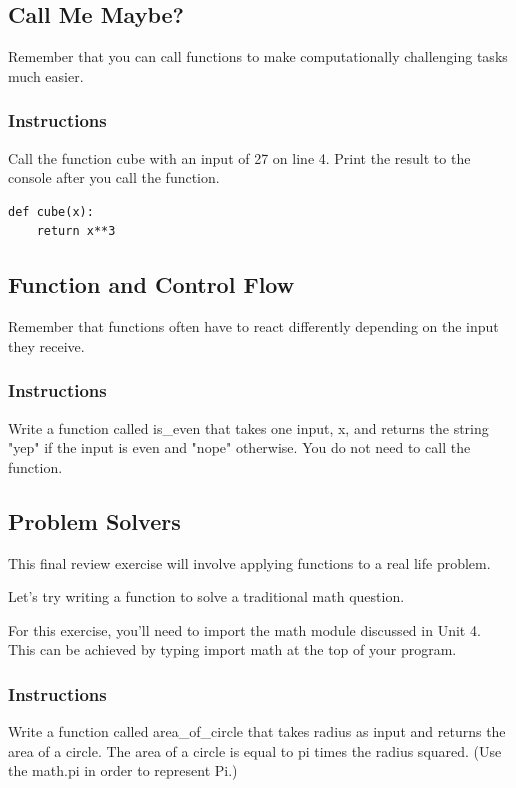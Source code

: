 \documentclass[12pt,a4paper,final,twoside,onecolumn,titlepage]{book}
\begin{document}
\subsection{Call Me Maybe?}

Remember that you can call functions to make computationally challenging tasks much easier.
\subsubsection{Instructions}

Call the function cube with an input of 27 on line 4. Print the result to the console after you call the function.
\begin{lstlisting}
def cube(x):
    return x**3

\end{lstlisting}

\subsection{Function and Control Flow}

Remember that functions often have to react differently depending on the input they receive.
\subsubsection{Instructions}

Write a function called is\_even that takes one input, x, and returns the string "yep" if the input is even and "nope" otherwise. You do not need to call the function.

\subsection{Problem Solvers}

This final review exercise will involve applying functions to a real life problem.

Let's try writing a function to solve a traditional math question.

For this exercise, you'll need to import the math module discussed in Unit 4. This can be achieved by typing import math at the top of your program.
\subsubsection{Instructions}

Write a function called area\_of\_circle that takes radius as input and returns the area of a circle. The area of a circle is equal to pi times the radius squared. (Use the math.pi in order to represent Pi.)
\end{document}
